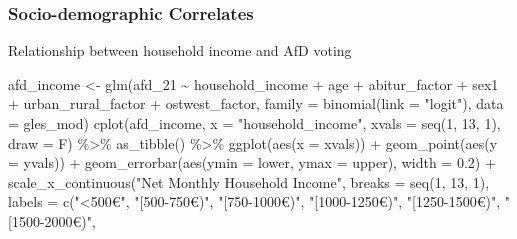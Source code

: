 \documentclass[
]{article}
\newenvironment{Shaded}{\begin{snugshade}}{\end{snugshade}}
\newcommand{\AttributeTok}[1]{\textcolor[rgb]{0.77,0.63,0.00}{#1}}
\newcommand{\DecValTok}[1]{\textcolor[rgb]{0.00,0.00,0.81}{#1}}
\newcommand{\FloatTok}[1]{\textcolor[rgb]{0.00,0.00,0.81}{#1}}
\newcommand{\FunctionTok}[1]{\textcolor[rgb]{0.00,0.00,0.00}{#1}}
\newcommand{\NormalTok}[1]{#1}
\newcommand{\OtherTok}[1]{\textcolor[rgb]{0.56,0.35,0.01}{#1}}
\newcommand{\SpecialCharTok}[1]{\textcolor[rgb]{0.00,0.00,0.00}{#1}}
\newcommand{\StringTok}[1]{\textcolor[rgb]{0.31,0.60,0.02}{#1}}
\begin{document}
\hypertarget{socio-demographic-correlates-2}{%
\subsubsection{Socio-demographic
Correlates}\label{socio-demographic-correlates-2}}

Relationship between household income and AfD voting

\begin{Shaded}
\begin{Highlighting}[]
\NormalTok{afd\_income }\OtherTok{\textless{}{-}} \FunctionTok{glm}\NormalTok{(afd\_21 }\SpecialCharTok{\textasciitilde{}}\NormalTok{ household\_income }\SpecialCharTok{+}\NormalTok{ age }\SpecialCharTok{+}\NormalTok{ abitur\_factor }\SpecialCharTok{+}\NormalTok{ sex1 }\SpecialCharTok{+}\NormalTok{ urban\_rural\_factor }\SpecialCharTok{+}\NormalTok{ ostwest\_factor, }\AttributeTok{family =} \FunctionTok{binomial}\NormalTok{(}\AttributeTok{link =} \StringTok{"logit"}\NormalTok{), }\AttributeTok{data =}\NormalTok{ gles\_mod)}
\FunctionTok{cplot}\NormalTok{(afd\_income, }\AttributeTok{x =} \StringTok{"household\_income"}\NormalTok{,}
      \AttributeTok{xvals =} \FunctionTok{seq}\NormalTok{(}\DecValTok{1}\NormalTok{, }\DecValTok{13}\NormalTok{, }\DecValTok{1}\NormalTok{), }\AttributeTok{draw =}\NormalTok{ F) }\SpecialCharTok{\%\textgreater{}\%}
  \FunctionTok{as\_tibble}\NormalTok{() }\SpecialCharTok{\%\textgreater{}\%}
  \FunctionTok{ggplot}\NormalTok{(}\FunctionTok{aes}\NormalTok{(}\AttributeTok{x =}\NormalTok{ xvals)) }\SpecialCharTok{+}
  \FunctionTok{geom\_point}\NormalTok{(}\FunctionTok{aes}\NormalTok{(}\AttributeTok{y =}\NormalTok{ yvals)) }\SpecialCharTok{+}
  \FunctionTok{geom\_errorbar}\NormalTok{(}\FunctionTok{aes}\NormalTok{(}\AttributeTok{ymin =}\NormalTok{ lower, }\AttributeTok{ymax =}\NormalTok{ upper), }\AttributeTok{width =} \FloatTok{0.2}\NormalTok{) }\SpecialCharTok{+}
  \FunctionTok{scale\_x\_continuous}\NormalTok{(}\StringTok{"Net Monthly Household Income"}\NormalTok{,}
                     \AttributeTok{breaks =} \FunctionTok{seq}\NormalTok{(}\DecValTok{1}\NormalTok{, }\DecValTok{13}\NormalTok{, }\DecValTok{1}\NormalTok{),}
                     \AttributeTok{labels =} \FunctionTok{c}\NormalTok{(}\StringTok{"\textless{}500€"}\NormalTok{, }\StringTok{"[500{-}750€)"}\NormalTok{,}
                                \StringTok{"[750{-}1000€)"}\NormalTok{, }\StringTok{"[1000{-}1250€)"}\NormalTok{, }
                                \StringTok{"[1250{-}1500€)"}\NormalTok{, }\StringTok{"[1500{-}2000€)"}\NormalTok{,}

\end{Highlighting}
\end{Shaded}
\end{document}
